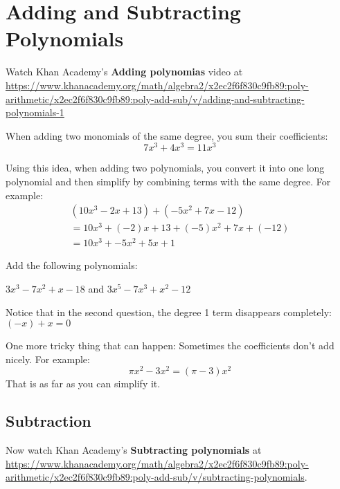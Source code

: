 \chapter{Adding and Subtracting Polynomials}

Watch Khan Academy's \textbf{Adding polynomias} video at \url{https://www.khanacademy.org/math/algebra2/x2ec2f6f830c9fb89:poly-arithmetic/x2ec2f6f830c9fb89:poly-add-sub/v/adding-and-subtracting-polynomials-1}

When adding two monomials of the same degree, you sum their coefficients:
\begin{equation*}
  7x^3 + 4x^3 = 11x^3
\end{equation*}

Using this idea, when adding two polynomials, you convert it into one long
polynomial and then simplify by combining terms with the same degree. For example:
\begin{multline*}
  (10x^3 - 2x + 13) + (-5x^2 + 7x -12) \\
  = 10x^3 + (-2)x + 13 + (-5)x^2 + 7x + (-12) \\
  = 10x^3 + -5x^2 + 5x + 1
\end{multline*}

\begin{Exercise}[title=Adding Polynomials Practice, label=addpns]
  Add the following polynomials:
  \vspace{20mm}
  \vspace{20mm}
\end{Exercise}
\begin{Answer}[ref=addpns]$3x^3 - 7x^2 + x - 18$ and $3x^5 - 7x^3 + x^2 - 12$\end{Answer}

Notice that in the second question, the degree 1 term disappears completely: $(-x) + x = 0$

One more tricky thing that can happen: Sometimes the coefficients don't add nicely.  For example:
\begin{equation*}
  \pi x^2 - 3 x^2 = (\pi - 3) x^2
\end{equation*}
That is as far as you can simplify it.
    
\section{Subtraction}

Now watch Khan Academy's \textbf{Subtracting polynomials} at \url{https://www.khanacademy.org/math/algebra2/x2ec2f6f830c9fb89:poly-arithmetic/x2ec2f6f830c9fb89:poly-add-sub/v/subtracting-polynomials}.


